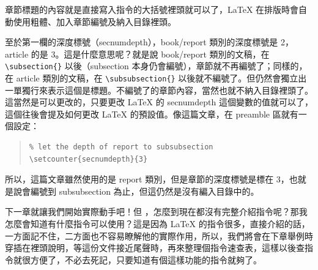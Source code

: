 章節標題的內容就是直接寫入指令的大括號裡頭就可以了，\LaTeX{} 在排版時會自動使用粗體、加入章節編號及納入目錄裡頭。

至於第一欄的深度標號（secnumdepth），{\ttfamily book/report} 類別的深度標號是 2，{\ttfamily article} 的是 3。這是什麼意思呢？就是說 {\ttfamily book/report} 類別的文稿，在 \verb|\subsection{}| 以後（{\ttfamily subsection} 本身仍會編號），章節就不再編號了；同樣的，在 {\ttfamily article} 類別的文稿，在 \verb|\subsubsection{}| 以後就不編號了。但仍然會獨立出一單獨行來表示這個是標題。不編號了的章節內容，當然也就不納入目錄裡頭了。這當然是可以更改的，只要更改 \LaTeX{} 的 {\ttfamily secnumdepth} 這個變數的值就可以了，這個往後會提及如何更改 \LaTeX{} 的預設值。像這篇文章，在 preamble 區就有一個設定：

\begin{quote}
   \begin{verbatim}
% let the depth of report to subsubsection
\setcounter{secnumdepth}{3}
\end{verbatim}
\end{quote}

所以，這篇文章雖然使用的是 {\ttfamily report} 類別，但是章節的深度標號是標在 3，也就是說會編號到 {\ttfamily subsubsection} 為止，但這仍然是沒有編入目錄中的。

下一章就讓我們開始實際動手吧！但 \chdots{}，怎麼到現在都沒有完整介紹指令呢？那我怎麼會知道有什麼指令可以使用？這是因為 \LaTeX{} 的指令很多，直接介紹的話，一方面記不住，二方面也不容易瞭解他的實際作用，所以，我們將會在下章舉例時穿插在裡頭說明，等這份文件接近尾聲時，再來整理個指令速查表，這樣以後查指令就很方便了，不必去死記，只要知道有個這樣功能的指令就夠了。

